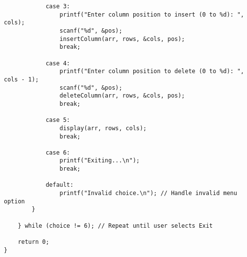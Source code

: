 \documentclass[12pt,a4paper]{article}
\begin{document}
\begin{lstlisting}
            case 3:
                printf("Enter column position to insert (0 to %d): ", cols);
                scanf("%d", &pos);
                insertColumn(arr, rows, &cols, pos);
                break;

            case 4:
                printf("Enter column position to delete (0 to %d): ", cols - 1);
                scanf("%d", &pos);
                deleteColumn(arr, rows, &cols, pos);
                break;

            case 5:
                display(arr, rows, cols);
                break;

            case 6:
                printf("Exiting...\n");
                break;

            default:
                printf("Invalid choice.\n"); // Handle invalid menu option
        }

    } while (choice != 6); // Repeat until user selects Exit

    return 0;
}
\end{lstlisting}

\newpage
\end{document}

